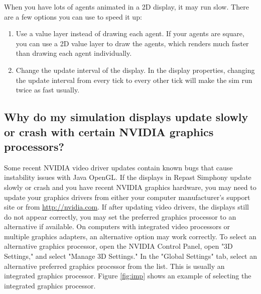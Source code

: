 \documentclass[11pt]{article}
\begin{document}
When you have lots of agents animated in a 2D display, it may run slow. There are a few options you can use to speed it up:

\begin{enumerate}
\item Use a value layer instead of drawing each agent. If your agents are square, you can use a 2D value layer to draw the agents, which renders much faster than drawing each agent individually.
\item Change the update interval of the display. In the display properties, changing the update interval from every tick to every other tick will make the sim run twice as fast usually.
\end{enumerate}

\subsection{Why do my simulation displays update slowly or crash with certain NVIDIA graphics processors?}
\label{p:nvidia}

Some recent NVIDIA video driver updates contain known bugs that cause instability issues with Java OpenGL. If the displays in Repast Simphony update slowly or crash and you have recent NVIDIA graphics hardware, you may need to update your graphics drivers from either your computer manufacturer's support site or from \url{http://nvidia.com}. If after updating video drivers, the displays still do not appear correctly, you may set the preferred graphics processor to an alternative if available. On computers with integrated video processors or multiple graphics adapters, an alternative option may work correctly. To select an alternative graphics processor, open the NVIDIA Control Panel, open "3D Settings," and select "Manage 3D Settings." In the "Global Settings" tab, select an alternative preferred graphics processor from the list. This is usually an integrated graphics processor. Figure \ref{fig:imp} shows an example of selecting the integrated graphics processor.
\end{document}
